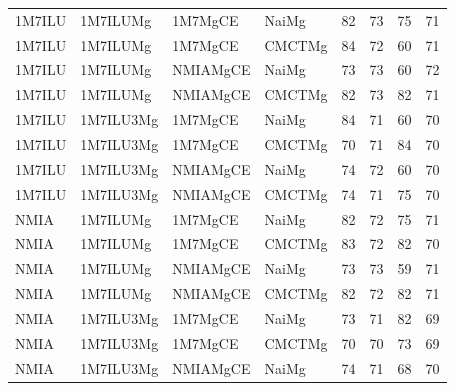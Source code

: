 \documentclass[a4,center,fleqn]{NAR}
\begin{document}
\begin{table}[h]
\begin{adjustbox}{max width=\linewidth}
\begin{tabular}{@{}llllHHHH@{}}
			\Q 1M7ILU          & \Q 1M7ILUMg        & \Q 1M7MgCE          & \Q NaiMg             & 82       & 73       & 75             & 71           \\
			\Q 1M7ILU          & \Q 1M7ILUMg        & \Q 1M7MgCE          & \Q CMCTMg            & 84       & 72       & 60             & 71           \\
			\Q 1M7ILU          & \Q 1M7ILUMg        & \Q NMIAMgCE         & \Q NaiMg             & 73       & 73       & 60             & 72           \\
			\Q 1M7ILU          & \Q 1M7ILUMg        & \Q NMIAMgCE         & \Q CMCTMg            & 82       & 73       & 82             & 71           \\
			\Q 1M7ILU          & \Q 1M7ILU3Mg       & \Q 1M7MgCE          & \Q NaiMg             & 84       & 71       & 60             & 70           \\
			\Q 1M7ILU          & \Q 1M7ILU3Mg       & \Q 1M7MgCE          & \Q CMCTMg            & 70       & 71       & 84             & 70           \\
			\Q 1M7ILU          & \Q 1M7ILU3Mg       & \Q NMIAMgCE         & \Q NaiMg             & 74       & 72       & 60             & 70           \\
			\Q 1M7ILU          & \Q 1M7ILU3Mg       & \Q NMIAMgCE         & \Q CMCTMg            & 74       & 71       & 75             & 70           \\
			\Q NMIA            & \Q 1M7ILUMg        & \Q 1M7MgCE          & \Q NaiMg             & 82       & 72       & 75             & 71           \\
			\Q NMIA            & \Q 1M7ILUMg        & \Q 1M7MgCE          & \Q CMCTMg            & 83       & 72       & 82             & 70           \\
			\Q NMIA            & \Q 1M7ILUMg        & \Q NMIAMgCE         & \Q NaiMg             & 73       & 73       & 59             & 71           \\
			\Q NMIA            & \Q 1M7ILUMg        & \Q NMIAMgCE         & \Q CMCTMg            & 82       & 72       & 82             & 71           \\
			\Q NMIA            & \Q 1M7ILU3Mg       & \Q 1M7MgCE          & \Q NaiMg             & 73       & 71       & 82             & 69           \\
			\Q NMIA            & \Q 1M7ILU3Mg       & \Q 1M7MgCE          & \Q CMCTMg            & 70       & 70       & 73             & 69           \\
			\Q NMIA            & \Q 1M7ILU3Mg       & \Q NMIAMgCE         & \Q NaiMg             & 74       & 71       & 68             & 70           \\

\end{tabular}
\end{adjustbox}
\end{table}
\end{document}
